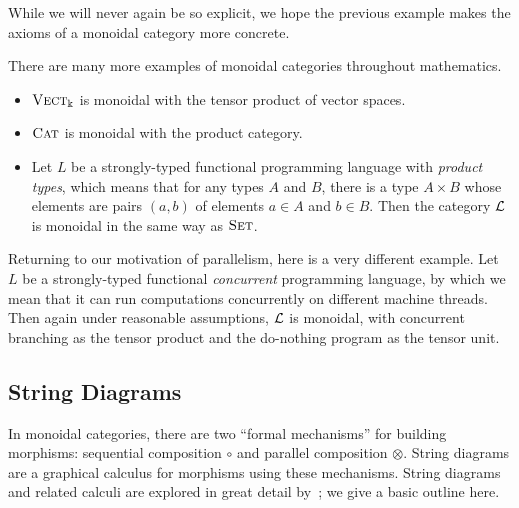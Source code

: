 While we will never again be so explicit, we hope the previous example makes the
axioms of a monoidal category more concrete.

\begin{ex}
  There are many more examples of monoidal categories throughout mathematics.
  \begin{itemize}
    \item ${\textsc{\text{Vect}}}_\Bbbk$ is monoidal with the tensor product of vector spaces.
    \item ${\textsc{\text{Cat}}}$ is monoidal with the product category.
    \item Let $L$ be a strongly-typed functional programming language with
      \emph{product types}, which means that for any types $A$ and $B$, there is
      a type $A\times B$ whose elements are pairs $(a, b)$ of elements $a\in A$
      and $b\in B$. Then the category $\mathcal{L}$ is monoidal in the same way as
      ${\textsc{\text{Set}}}$.
  \end{itemize}
\end{ex}

\begin{ex}
  Returning to our motivation of parallelism, here is a very different example.
  Let $L$ be a strongly-typed functional \emph{concurrent} programming language,
  by which we mean that it can run computations concurrently on different
  machine threads. Then again under reasonable assumptions, $\mathcal{L}$ is monoidal,
  with concurrent branching as the tensor product and the do-nothing program as
  the tensor unit.
\end{ex}

\subsection{String Diagrams}

In monoidal categories, there are two ``formal mechanisms'' for building
morphisms: sequential composition $\circ$ and parallel composition $\otimes$.
String diagrams are a graphical calculus for morphisms using these mechanisms.
String diagrams and related calculi are explored in great detail
by~\cite{selinger-2011}; we give a basic outline here.


